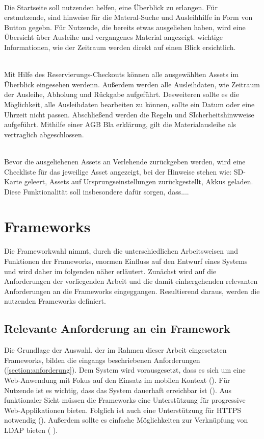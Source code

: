{\sffamily\color{maincolor}{Ft-A-1 | Startübersicht }}\\
Die Startseite soll nutzenden helfen, eine  Überblick zu erlangen. Für
erstnutzende, sind hinweise für die Materal-Suche und Ausleihhilfe in Form von
Button gegebn. Für Nutzende, die bereits etwas ausgeliehen haben, wird eine
Übersicht über Ausleihe und vergangenes Material angezeigt. wichtige
Informationen, wie der Zeitraum werden direkt auf einen Blick ersichtlich.

    {\sffamily\color{maincolor}{Ft-A-2 | Reservierungs-Checkout }}\\
Mit Hilfe des Reservierungs-Checkouts können alle ausgewählten Assets im
Überblick eingesehen werdenn. Außerdem werden alle Ausleihdaten, wie Zeitraum
der Ausleihe, Abholung und Rückgabe aufgeführt. Desweiteren sollte es die
Möglichkeit, alle Ausleihdaten bearbeiten zu können, sollte ein Datum oder eine
Uhrzeit nicht passen. Abschließend werden die Regeln und SIcherheitshinwweise
aufgeführt. Mithilfe einer AGB Bla erklärung, gilt die Materialausleihe als
vertraglich abgeschlossen.

    {\sffamily\color{maincolor}{Ft-A-3 | Rückgabe-Checkliste}}\\
Bevor die ausgeliehenen Assets an Verlehende zurückgeben werden, wird eine
Checkliste für das jeweilige Asset angezeigt, bei der Hinweise stehen wie:
SD-Karte geleert, Assets auf Ursprungseinstellungen zurückgestellt, Akkus
geladen. Diese Funktionalität soll insbesondere dafür sorgen, dass....


\section{Frameworks}
\label{section:frameworks}
Die Frameworkwahl nimmt, durch die unterschiedlichen Arbeitsweisen und
Funktionen der Frameworks, enormen Einfluss auf den Entwurf eines Systems und
wird daher im folgenden näher erläutert. Zunächst wird auf die Anforderungen der
vorliegenden Arbeit und die damit einhergehenden relevanten Anforderungen an die
Frameworks eingeggangen. Resultierend daraus, werden die nutzenden Frameworks
definiert.

\subsection{Relevante Anforderung an ein Framework}
Die Grundlage der Auswahl, der im Rahmen dieser Arbeit eingesetzten Frameworks,
bilden die eingangs beschriebenen Anforderungen (\ref{section:anforderung}). Dem
System wird vorausgesetzt, dass es sich um eine Web-Anwendung mit Fokus auf den
Einsatz im mobilen Kontext (). Für Nutzende ist es
wichtig, dass das System dauerhaft erreichbar ist (). Aus
funktionaler Sicht müssen die Frameworks eine Unterstützung für progressive
Web-Applikationen bieten. Folglich ist auch eine Unterstützung für HTTPS
notwendig (). Außerdem sollte es einfache Möglichkeiten zur
Verknüpfung von LDAP bieten ( ).

